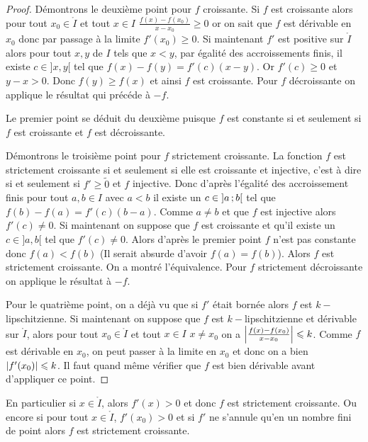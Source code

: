 \begin{proof}
  Démontrons le deuxième point pour \(f\) croissante. Si \(f\) est croissante alors pour tout \(x_0 \in \mathring{I}\) et tout \(x \in I\) \(\frac{f(x)-f(x_0)}{x-x_0} \geqslant 0\) or on sait que \(f\) est dérivable en \(x_0\) donc par passage à la limite \(f'(x_0) \geqslant 0\). Si maintenant \(f'\) est positive sur \(\mathring{I}\) alors pour tout \(x,y\) de \(I\) tels que \(x < y\), par égalité des accroissements finis, il existe \(c \in ]x,y[\) tel que \(f(x)-f(y) = f'(c)(x-y)\). Or \(f'(c) \geqslant 0\) et \(y-x > 0\). Donc \(f(y) \geqslant f(x)\) et ainsi \(f\) est croissante. Pour \(f\) décroissante on applique le résultat qui précéde à \(-f\).

Le premier point se déduit du deuxième puisque \(f\) est constante si et seulement si \(f\) est croissante et \(f\) est décroissante.

Démontrons le troisième point pour \(f\) strictement croissante. La fonction \(f\) est strictement croissante si et seulement si elle est croissante et injective, c'est à dire si et seulement si \(f' \geqslant \tilde{0}\) et \(f\) injective. Donc d'après l'égalité des accroissement finis pour tout \(a,b \in I\) avec \(a <b\) il existe un \(c \in \left] a \, ;  b \right[\) tel que \(f(b)-f(a)=f'(c)(b-a)\). Comme \(a \neq b\) et que \(f\) est injective alors \(f'(c) \neq 0\). Si maintenant on suppose que \(f\) est croissante et qu'il existe un \(c \in ]a,b[\) tel que \(f'(c) \neq 0\). Alors d'après le premier point \(f\) n'est pas constante donc \(f(a) < f(b)\) (Il serait absurde d'avoir \(f(a)=f(b)\)). Alors \(f\) est strictement croissante. On a montré l'équivalence. Pour \(f\) strictement décroissante on applique le résultat à \(-f\).

Pour le quatrième point, on a déjà vu que si \(f'\) était bornée alors \(f\) est \(k-\)lipschitzienne. Si maintenant on suppose que \(f\) est \(k-\)lipschitzienne et dérivable sur \(\mathring{I}\), alors pour tout \(x_0 \in \mathring{I}\) et tout \(x \in I\) \(x \neq x_0\) on a \(\left\lvert\frac{f(x)-f(x_0)}{x-x_0}\right\rvert \leqslant k\). Comme \(f\) est dérivable en \(x_0\), on peut passer à la limite en \(x_0\) et donc on a bien \(\left\lvert f'(x_0)\right\rvert \leqslant k\). Il faut quand même vérifier que \(f\) est bien dérivable avant d'appliquer ce point.
\end{proof}

En particulier si \(x \in \mathring{I}\), alors \(f'(x)>0\) et donc \(f\) est strictement croissante. Ou encore si pour tout \(x \in \mathring{I}\),  \(f'(x_0) >0\) et si \(f'\) ne s'annule qu'en un nombre fini de point alors \(f\) est strictement croissante.

